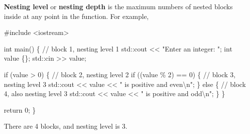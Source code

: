 \documentclass[
  letterpaper,
  DIV=11,
  numbers=noendperiod]{scrreprt}
\newenvironment{Shaded}{\begin{snugshade}}{\end{snugshade}}
\newcommand{\CommentTok}[1]{\textcolor[rgb]{0.37,0.37,0.37}{#1}}
\newcommand{\ControlFlowTok}[1]{\textcolor[rgb]{0.00,0.23,0.31}{#1}}
\newcommand{\DecValTok}[1]{\textcolor[rgb]{0.68,0.00,0.00}{#1}}
\newcommand{\ErrorTok}[1]{\textcolor[rgb]{0.68,0.00,0.00}{#1}}
\newcommand{\FunctionTok}[1]{\textcolor[rgb]{0.28,0.35,0.67}{#1}}
\newcommand{\NormalTok}[1]{\textcolor[rgb]{0.00,0.23,0.31}{#1}}
\newcommand{\SpecialCharTok}[1]{\textcolor[rgb]{0.37,0.37,0.37}{#1}}
\newcommand{\StringTok}[1]{\textcolor[rgb]{0.13,0.47,0.30}{#1}}
\begin{document}
\textbf{Nesting level} or \textbf{nesting depth} is the maximum numbers
of nested blocks inside at any point in the function. For example,

\begin{Shaded}
\begin{Highlighting}[]
\CommentTok{\#include \textless{}iostream\textgreater{}}

\NormalTok{int }\FunctionTok{main}\NormalTok{()}
\NormalTok{\{ }\SpecialCharTok{/}\ErrorTok{/}\NormalTok{ block }\DecValTok{1}\NormalTok{, nesting level }\DecValTok{1}
\NormalTok{    std}\SpecialCharTok{::}\NormalTok{cout }\SpecialCharTok{\textless{}}\ErrorTok{\textless{}} \StringTok{"Enter an integer: "}\NormalTok{;}
\NormalTok{    int value \{\};}
\NormalTok{    std}\SpecialCharTok{::}\NormalTok{cin }\SpecialCharTok{\textgreater{}}\ErrorTok{\textgreater{}}\NormalTok{ value;}

    \ControlFlowTok{if}\NormalTok{ (value }\SpecialCharTok{\textgreater{}}  \DecValTok{0}\NormalTok{)}
\NormalTok{    \{ }\SpecialCharTok{/}\ErrorTok{/}\NormalTok{ block }\DecValTok{2}\NormalTok{, nesting level }\DecValTok{2}
        \ControlFlowTok{if}\NormalTok{ ((value \% }\DecValTok{2}\NormalTok{) }\SpecialCharTok{==} \DecValTok{0}\NormalTok{)}
\NormalTok{        \{ }\SpecialCharTok{/}\ErrorTok{/}\NormalTok{ block }\DecValTok{3}\NormalTok{, nesting level }\DecValTok{3}
\NormalTok{            std}\SpecialCharTok{::}\NormalTok{cout }\SpecialCharTok{\textless{}}\ErrorTok{\textless{}}\NormalTok{ value }\SpecialCharTok{\textless{}}\ErrorTok{\textless{}} \StringTok{" is positive and even}\SpecialCharTok{\textbackslash{}n}\StringTok{"}\NormalTok{;}
\NormalTok{        \}}
        \ControlFlowTok{else}
\NormalTok{        \{ }\SpecialCharTok{/}\ErrorTok{/}\NormalTok{ block }\DecValTok{4}\NormalTok{, also nesting level }\DecValTok{3}
\NormalTok{            std}\SpecialCharTok{::}\NormalTok{cout }\SpecialCharTok{\textless{}}\ErrorTok{\textless{}}\NormalTok{ value }\SpecialCharTok{\textless{}}\ErrorTok{\textless{}} \StringTok{" is positive and odd}\SpecialCharTok{\textbackslash{}n}\StringTok{"}\NormalTok{;}
\NormalTok{        \}}
\NormalTok{    \}}

\NormalTok{    return }\DecValTok{0}\NormalTok{;}
\NormalTok{\}}
\end{Highlighting}
\end{Shaded}

There are 4 blocks, and nesting level is 3.
\end{document}
